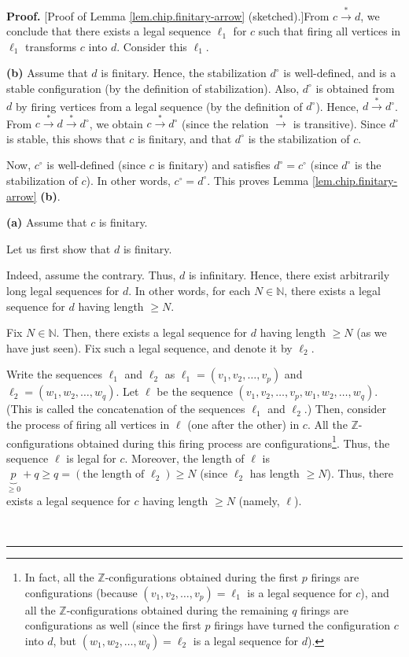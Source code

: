 \documentclass[numbers=enddot,12pt,final,onecolumn,notitlepage]{scrartcl}%
\theoremstyle{definition}
\newenvironment{proof}[1][Proof]{\noindent\textbf{#1.} }{\ \rule{0.5em}{0.5em}}
\begin{document}
\begin{proof}
[Proof of Lemma \ref{lem.chip.finitary-arrow} (sketched).]From $c\overset{\ast
}{\rightarrow}d$, we conclude that there exists a legal sequence $\ell_{1}$
for $c$ such that firing all vertices in $\ell_{1}$ transforms $c$ into $d$.
Consider this $\ell_{1}$.

\textbf{(b)} Assume that $d$ is finitary. Hence, the stabilization $d^{\circ}$
is well-defined, and is a stable configuration (by the definition of
stabilization). Also, $d^{\circ}$ is obtained from $d$ by firing vertices from
a legal sequence (by the definition of $d^{\circ}$). Hence, $d\overset{\ast
}{\rightarrow}d^{\circ}$. From $c\overset{\ast}{\rightarrow}d\overset{\ast
}{\rightarrow}d^{\circ}$, we obtain $c\overset{\ast}{\rightarrow}d^{\circ}$
(since the relation $\overset{\ast}{\rightarrow}$ is transitive). Since
$d^{\circ}$ is stable, this shows that $c$ is finitary, and that $d^{\circ}$
is the stabilization of $c$.

Now, $c^{\circ}$ is well-defined (since $c$ is finitary) and satisfies
$d^{\circ}=c^{\circ}$ (since $d^{\circ}$ is the stabilization of $c$). In
other words, $c^{\circ}=d^{\circ}$. This proves Lemma
\ref{lem.chip.finitary-arrow} \textbf{(b)}.

\textbf{(a)} Assume that $c$ is finitary.

Let us first show that $d$ is finitary.

Indeed, assume the contrary. Thus, $d$ is infinitary. Hence, there exist
arbitrarily long legal sequences for $d$. In other words, for each
$N\in\mathbb{N}$, there exists a legal sequence for $d$ having length $\geq N$.

Fix $N\in\mathbb{N}$. Then, there exists a legal sequence for $d$ having
length $\geq N$ (as we have just seen). Fix such a legal sequence, and denote
it by $\ell_{2}$.

Write the sequences $\ell_{1}$ and $\ell_{2}$ as $\ell_{1}=\left(  v_{1}%
,v_{2},\ldots,v_{p}\right)  $ and $\ell_{2}=\left(  w_{1},w_{2},\ldots
,w_{q}\right)  $. Let $\ell$ be the sequence $\left(  v_{1},v_{2},\ldots
,v_{p},w_{1},w_{2},\ldots,w_{q}\right)  $. (This is called the concatenation
of the sequences $\ell_{1}$ and $\ell_{2}$.) Then, consider the process of
firing all vertices in $\ell$ (one after the other) in $c$. All the
$\mathbb{Z}$-configurations obtained during this firing process are
configurations\footnote{In fact, all the $\mathbb{Z}$-configurations obtained
during the first $p$ firings are configurations (because $\left(  v_{1}%
,v_{2},\ldots,v_{p}\right)  =\ell_{1}$ is a legal sequence for $c$), and all
the $\mathbb{Z}$-configurations obtained during the remaining $q$ firings are
configurations as well (since the first $p$ firings have turned the
configuration $c$ into $d$, but $\left(  w_{1},w_{2},\ldots,w_{q}\right)
=\ell_{2}$ is a legal sequence for $d$).}. Thus, the sequence $\ell$ is legal
for $c$. Moreover, the length of $\ell$ is $\underbrace{p}_{\geq0}+q\geq
q=\left(  \text{the length of }\ell_{2}\right)  \geq N$ (since $\ell_{2}$ has
length $\geq N$). Thus, there exists a legal sequence for $c$ having length
$\geq N$ (namely, $\ell$).


\end{proof}
\end{document}
